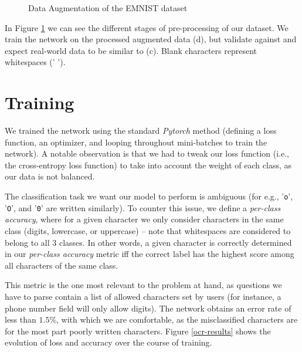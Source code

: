 \documentclass[11pt, a4paper]{report}
\def\code#1{\texttt{#1}}
\begin{document}
\begin{figure}[!h]
\begin{center}
		\hspace{1cm}
	\end{center}
	\caption{Data Augmentation of the EMNIST dataset}
	\label{emnist-transformation}
\end{figure}

In Figure \ref{emnist-transformation} we can see the different stages of pre-processing of our dataset. We train the network on the processed augmented data (d), but validate against and expect real-world data to be similar to (c). Blank characters represent whitespaces (' ').

\section{Training}

We trained the network using the standard \textit{Pytorch} method (defining a loss function, an optimizer, and looping throughout mini-batches to train the network). A notable observation is that we had to tweak our loss function (i.e., the cross-entropy loss function) to take into account the weight of each class, as our data is not balanced.

The classification task we want our model to perform is ambiguous (for e.g., '\code{o}', '\code{O}', and '\code{0}' are written similarly). To counter this issue, we define a \textit{per-class accuracy}, where for a given character we only consider characters in the same class (digits, lowercase, or uppercase) -- note that whitespaces are considered to belong to all $3$ classes. In other words, a given character is correctly determined in our \textit{per-class accuracy} metric iff the correct label has the highest score among all characters of the same class.

This metric is the one most relevant to the problem at hand, as questions we have to parse contain a list of allowed characters set by users (for instance, a phone number field will only allow digits). The network obtains an error rate of less than $1.5\%$, with which we are comfortable, as the misclassified characters are for the most part poorly written characters. Figure \ref{ocr-results} shows the evolution of loss and accuracy over the course of training. 
\end{document}
